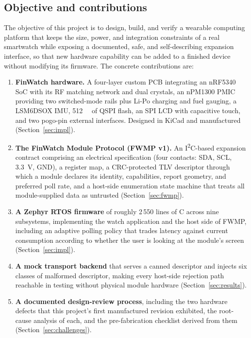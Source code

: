 \documentclass[12pt, a4paper]{article}
\begin{document}
\subsection{Objective and contributions}

The objective of this project is to design, build, and verify a wearable
computing platform that keeps the size, power, and integration constraints of a
real smartwatch while exposing a documented, safe, and self-describing
expansion interface, so that new hardware capability can be added to a finished
device without modifying its firmware.\newpage
The concrete contributions are:

\begin{enumerate}
  \item \textbf{FinWatch hardware.} A four-layer custom PCB integrating an
  nRF5340 SoC with its RF matching network and dual crystals, an nPM1300 PMIC
  providing two switched-mode rails plus Li-Po charging and fuel gauging, a
  LSM6DSOX IMU, \SI{512}{\mega\bit} of QSPI flash, an SPI LCD with capacitive
  touch, and two pogo-pin external interfaces. Designed in KiCad and
  manufactured (Section~\ref{sec:impl}).

  \item \textbf{The FinWatch Module Protocol (FWMP v1).} An
  I\textsuperscript{2}C-based expansion contract comprising an electrical
  specification (four contacts: SDA, SCL, \SI{3.3}{\volt}, GND), a register map,
  a CRC-protected TLV descriptor through which a module declares its identity,
  capabilities, report geometry, and preferred poll rate, and a host-side
  enumeration state machine that treats all module-supplied data as untrusted
  (Section~\ref{sec:fwmp}).

  \item \textbf{A Zephyr RTOS firmware} of roughly 2\,550 lines of C across nine
  subsystems, implementing the watch application and the host side of FWMP,
  including an adaptive polling policy that trades latency against current
  consumption according to whether the user is looking at the module's screen
  (Section~\ref{sec:impl}).

  \item \textbf{A mock transport backend} that serves a canned descriptor and
  injects six classes of malformed descriptor, making every host-side rejection
  path reachable in testing without physical module hardware
  (Section~\ref{sec:results}).

  \item \textbf{A documented design-review process}, including the two hardware
  defects that this project's first manufactured revision exhibited, the
  root-cause analysis of each, and the pre-fabrication checklist derived from
  them (Section~\ref{sec:challenges}).
\end{enumerate}
\end{document}
